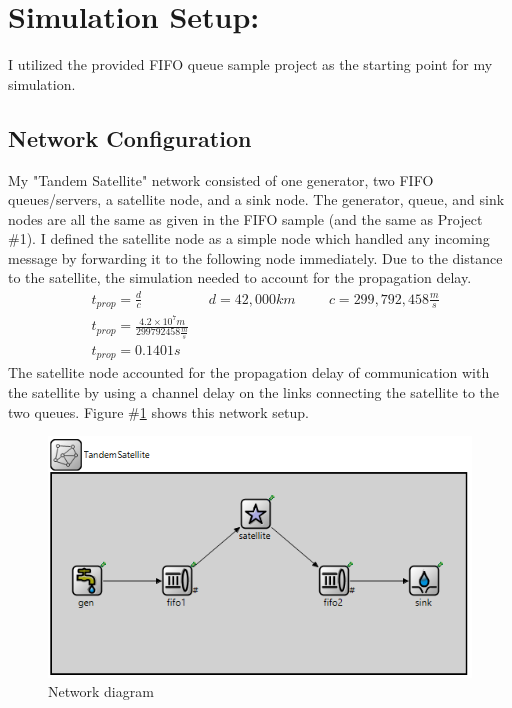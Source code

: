 \documentclass{article}
\begin{document}

\section{Simulation Setup:}
I utilized the provided FIFO queue sample project as the starting point for my simulation.

\subsection{Network Configuration}  
My "Tandem Satellite" network consisted of one generator, two FIFO queues/servers, a satellite node, and a sink node.  
The generator, queue, and sink nodes are all the same as given in the FIFO sample (and the same as Project \#1).  
I defined the satellite node as a simple node which handled any incoming message by forwarding it to the following node immediately.  
Due to the distance to the satellite, the simulation needed to account for the propagation delay.
\begin{align*}
& t_{prop} = \frac{d}{c} \hspace{2cm} d = 42,000km  \hspace{1cm} c = 299,792,458 \frac{m}{s} \\
& t_{prop} = \frac{4.2 \times 10^7 m}{299792458 \frac{m}{s}} \\
& \boxed{t_{prop} = 0.1401 s}
\end{align*}
The satellite node accounted for the propagation delay of communication with the satellite by using a channel delay on the links connecting the satellite to the two queues.
Figure \#\ref{diagram} shows this network setup. 

\begin{figure}[h!]
	\begin{center}
	\includegraphics[scale=1.0]{Images/TandemSatellite.PNG}
	\vspace{-.25cm}
	\caption{Network diagram}
	\label{diagram}
	\end{center}
\end{figure}
\end{document}
